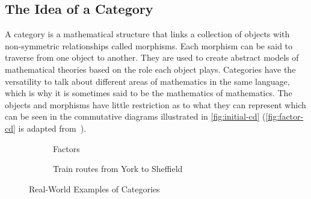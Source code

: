 %
%
\subsection{The Idea of a Category}

A category is a mathematical structure that links a collection of objects with
non-symmetric relationships called morphisms. Each morphism can be said to
traverse from one object to another. They are used to create abstract models of
mathematical theories based on the role each object plays. Categories have the
versatility to talk about different areas of mathematics in the same language,
which is why it is sometimes said to be the mathematics of mathematics. The
objects and morphisms have little restriction as to what they can represent
which can be seen in the commutative diagrams illustrated in
\autoref{fig:initial-cd} (\autoref{fig:factor-cd} is adapted
from~\autocite{Cheng:2022}).
\begin{figure}[ht]
        \vspace{\belowcaptionskip}
        \begin{subfigure}{.45\textwidth}
                \centering
                \vspace{1em}%
                \caption{Factors}%
                \label{fig:factor-cd}
        \end{subfigure}
        \vspace{-\belowcaptionskip}%
        \begin{subfigure}{.45\textwidth}
                \centering
                \vspace{1em}%
                \caption{Train routes from York to Sheffield}
        \end{subfigure}%
        \caption{Real-World Examples of Categories}%
        \label{fig:initial-cd}
\end{figure}

